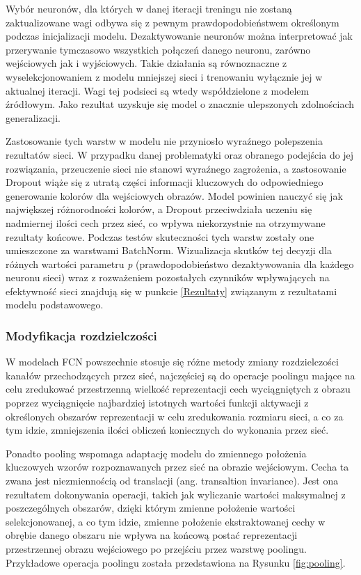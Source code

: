   Wybór neuronów, dla których w danej iteracji treningu nie zostaną
  zaktualizowane wagi odbywa się z pewnym prawdopodobieństwem określonym
  podczas inicjalizacji modelu. Dezaktywowanie neuronów można interpretować jak
  przerywanie tymczasowo wszystkich połączeń danego neuronu, zarówno wejściowych
  jak i wyjściowych. Takie działania są równoznaczne z wyselekcjonowaniem z modelu
  mniejszej sieci i trenowaniu wyłącznie jej w aktualnej iteracji. Wagi tej
  podsieci są wtedy współdzielone z modelem źródłowym.
  Jako rezultat uzyskuje się model o znacznie ulepszonych zdolnościach generalizacji.

  Zastosowanie tych warstw w modelu nie przyniosło wyraźnego polepszenia rezultatów
  sieci. W przypadku danej problematyki oraz obranego podejścia do jej rozwiązania,
  przeuczenie sieci nie stanowi wyraźnego zagrożenia, a zastosowanie Dropout
  wiąże się z utratą części informacji kluczowych do odpowiedniego
  generowanie kolorów dla wejściowych obrazów. Model powinien nauczyć się jak
  największej różnorodności kolorów, a Dropout przeciwdziała uczeniu się
  nadmiernej ilości cech przez sieć, co wpływa niekorzystnie na otrzymywane
  rezultaty końcowe. Podczas testów skuteczności tych warstw zostały one umieszczone
  za warstwami BatchNorm. Wizualizacja skutków tej decyzji dla różnych wartości
  parametru \textit{p} (prawdopodobieństwo dezaktywowania dla każdego neuronu sieci)
  wraz z rozważeniem
  pozostałych czynników wpływających na efektywność sieci znajdują się w
  punkcie \ref{Rezultaty} związanym z rezultatami modelu podstawowego.

\subsubsection{Modyfikacja rozdzielczości}

  W modelach FCN powszechnie stosuje się różne metody zmiany rozdzielczości
  kanałów przechodzących przez sieć, najczęściej są do operacje poolingu mające
  na celu zredukować przestrzenną wielkość reprezentacji cech wyciągniętych z
  obrazu poprzez wyciągnięcie najbardziej istotnych wartości funkcji aktywacji z
  określonych obszarów reprezentacji w celu zredukowania rozmiaru
  sieci, a co za tym idzie, zmniejszenia ilości obliczeń koniecznych do wykonania
  przez sieć.

  Ponadto pooling wspomaga adaptację modelu do zmiennego położenia
  kluczowych wzorów rozpoznawanych przez sieć na obrazie wejściowym. Cecha ta
  zwana jest niezmiennością od translacji (ang. transaltion invariance). Jest
  ona rezultatem dokonywania operacji, takich jak wyliczanie wartości maksymalnej
  z poszczególnych obszarów, dzięki którym zmienne położenie wartości
  selekcjonowanej, a co tym idzie, zmienne położenie ekstraktowanej cechy w obrębie
  danego obszaru nie wpływa na końcową postać reprezentacji przestrzennej obrazu
  wejściowego po przejściu przez warstwę poolingu. Przykładowe operacja poolingu
  została przedstawiona na Rysunku \ref{fig:pooling}.

